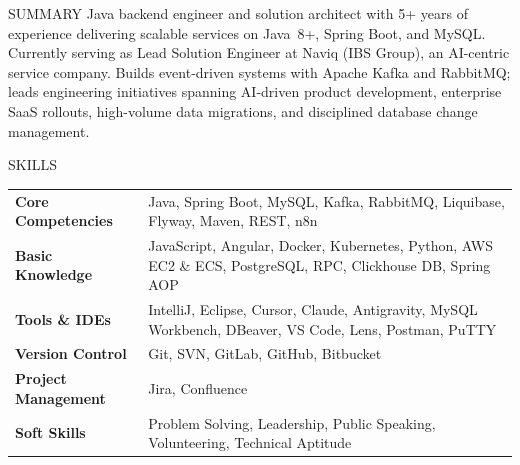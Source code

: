 \documentclass{resume} %
\begin{document}
\vspace{-0.8em} %
    \vspace{-0.5em} %

\begin{rSection}{SUMMARY}
{Java backend engineer and solution architect with 5+ years of experience delivering scalable services on Java~8+, Spring Boot, and MySQL. Currently serving as Lead Solution Engineer at Naviq (IBS Group), an AI-centric service company. Builds event-driven systems with Apache Kafka and RabbitMQ; leads engineering initiatives spanning AI-driven product development, enterprise SaaS rollouts, high-volume data migrations, and disciplined database change management.}
\end{rSection}
\vspace{-0.8em} %

\begin{rSection}{SKILLS}
\begin{tabularx}{\linewidth}{@{}>{\bfseries}l @{\hspace{3.5ex}} >{\RaggedRight}X @{}}
\textbf{Core Competencies} & Java, Spring Boot, MySQL, Kafka, RabbitMQ, Liquibase, Flyway, Maven, REST, n8n \\
\textbf{Basic Knowledge} & JavaScript, Angular, Docker, Kubernetes, Python, AWS EC2 \& ECS, PostgreSQL, RPC, Clickhouse DB, Spring AOP \\
\textbf{Tools \& IDEs} & IntelliJ, Eclipse, Cursor, Claude, Antigravity, MySQL Workbench, DBeaver, VS Code, Lens, Postman, PuTTY \\
\textbf{Version Control} & Git, SVN, GitLab, GitHub, Bitbucket \\
\textbf{Project Management} & Jira, Confluence \\
\textbf{Soft Skills} & Problem Solving, Leadership, Public Speaking, Volunteering, Technical Aptitude \\
\end{tabularx}
\end{rSection}

\vspace{-0.5em} %
\end{document}
